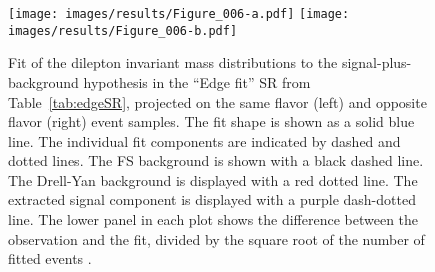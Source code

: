 \begin{figure}[!hbtp]
\centering
\texttt{[image: images/results/Figure\_006-a.pdf]}
\texttt{[image: images/results/Figure\_006-b.pdf]}
\caption{Fit of the dilepton invariant mass distributions to the signal-plus-background hypothesis in the ``Edge fit'' SR from Table~\ref{tab:edgeSR}, projected on the same flavor (left) and opposite flavor (right) event samples. The fit shape is shown as a solid blue line. The individual fit components are indicated by dashed and dotted lines. The FS background is shown with a black dashed line. The Drell-Yan background is displayed with a red dotted line. The extracted signal component is displayed with a purple dash-dotted line. The lower panel in each plot shows the difference between the observation and the fit, divided by the square root of the number of fitted events \cite{Sirunyan:2017qaj}.}
\label{fig:Fit_data_H1}
\end{figure}

